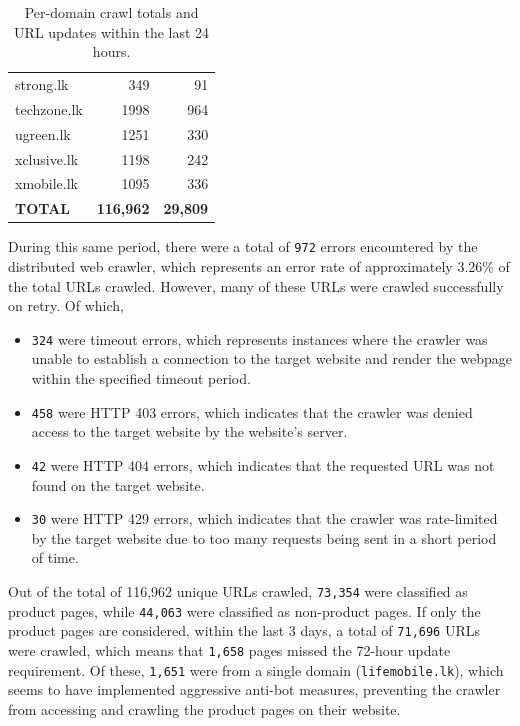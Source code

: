 \begin{table}[H]
\begin{tabular}{lrr}
        strong.lk & 349 & 91 \\
        techzone.lk & 1998 & 964 \\
        ugreen.lk & 1251 & 330 \\
        xclusive.lk & 1198 & 242 \\
        xmobile.lk & 1095 & 336 \\
        \midrule
        \textbf{TOTAL} & \textbf{116,962} & \textbf{29,809} \\
        \bottomrule
    \end{tabular}
    \caption{Per-domain crawl totals and URL updates within the last 24 hours.}
    \label{tab:crawler_last_updated_24h}
\end{table}

During this same period, there were a total of \texttt{972} errors encountered by the distributed web crawler, which represents an error rate of approximately 3.26\% of the total URLs crawled.
However, many of these URLs were crawled successfully on retry.
Of which,
\begin{itemize}
    \item \texttt{324} were timeout errors, which represents instances where the crawler was unable to establish a connection to the target website and render the webpage within the specified timeout period.
    \item \texttt{458} were HTTP 403 errors, which indicates that the crawler was denied access to the target website by the website's server.
    \item \texttt{42} were HTTP 404 errors, which indicates that the requested URL was not found on the target website.
    \item \texttt{30} were HTTP 429 errors, which indicates that the crawler was rate-limited by the target website due to too many requests being sent in a short period of time.
\end{itemize}

Out of the total of 116,962 unique URLs crawled, \texttt{73,354} were classified as product pages, while \texttt{44,063} were classified as non-product pages.
If only the product pages are considered, within the last 3 days, a total of \texttt{71,696} URLs were crawled, which means that \texttt{1,658} pages missed the 72-hour update requirement.
Of these, \texttt{1,651} were from a single domain (\texttt{lifemobile.lk}), which seems to have implemented aggressive anti-bot measures, preventing the crawler from accessing and crawling the product pages on their website.

